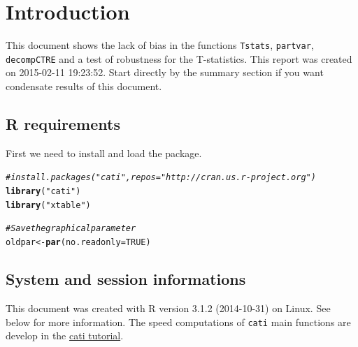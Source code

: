 \documentclass[12pt]{article}\usepackage[]{graphicx}\usepackage[]{color}
\makeatletter
\newcommand{\hlnum}[1]{\textcolor[rgb]{0.686,0.059,0.569}{#1}}%
\newcommand{\hlstr}[1]{\textcolor[rgb]{0.192,0.494,0.8}{#1}}%
\newcommand{\hlcom}[1]{\textcolor[rgb]{0.678,0.584,0.686}{\textit{#1}}}%
\newcommand{\hlstd}[1]{\textcolor[rgb]{0.345,0.345,0.345}{#1}}%
\newcommand{\hlkwb}[1]{\textcolor[rgb]{0.69,0.353,0.396}{#1}}%
\newcommand{\hlkwc}[1]{\textcolor[rgb]{0.333,0.667,0.333}{#1}}%
\newcommand{\hlkwd}[1]{\textcolor[rgb]{0.737,0.353,0.396}{\textbf{#1}}}%
\newenvironment{kframe}{%
 \def\at@end@of@kframe{}%
 \ifinner\ifhmode%
  \def\at@end@of@kframe{\end{minipage}}%
  \begin{minipage}{\columnwidth}%
 \fi\fi%
 \def\FrameCommand##1{\hskip\@totalleftmargin \hskip-\fboxsep
 \colorbox{shadecolor}{##1}\hskip-\fboxsep
     \hskip-\linewidth \hskip-\@totalleftmargin \hskip\columnwidth}%
 \MakeFramed {\advance\hsize-\width
   \@totalleftmargin\z@ \linewidth\hsize
   \@setminipage}}%
 {\par\unskip\endMakeFramed%
 \at@end@of@kframe}
\newenvironment{knitrout}{}{} %
\makeatother
\begin{document}
\newpage
\tableofcontents
\newpage


\section{Introduction}
 This document shows the lack of bias in the functions \texttt{Tstats}, \texttt{partvar}, \texttt{decompCTRE} and a test of robustness for the T-statistics.
This report was created on 2015-02-11 19:23:52. Start directly by the summary section if you want condensate results of this document.

\subsection{R requirements}

First we need to install and load the package. 
\begin{knitrout}\small
{}\color{fgcolor}\begin{kframe}
\begin{alltt}
\hlcom{# install.packages("cati", repos = "http://cran.us.r-project.org")}
\hlkwd{library}\hlstd{(}\hlstr{"cati"}\hlstd{)}
\hlkwd{library}\hlstd{(}\hlstr{"xtable"}\hlstd{)}

\hlcom{# Save the graphical parameter}
\hlstd{oldpar} \hlkwb{<-} \hlkwd{par}\hlstd{(}\hlkwc{no.readonly} \hlstd{=} \hlnum{TRUE}\hlstd{)}
\end{alltt}
\end{kframe}
\end{knitrout}

  \subsection{System and session informations}
  This document was created with R version 3.1.2 (2014-10-31) on Linux. See below for more information. The speed computations of \texttt{cati} main functions are develop  in the \href{https://github.com/adrientaudiere/cati/blob/Package-cati/Documentation/vignette_Darwin_finches/vignette.pdf}{cati tutorial}.
  
\end{document}
